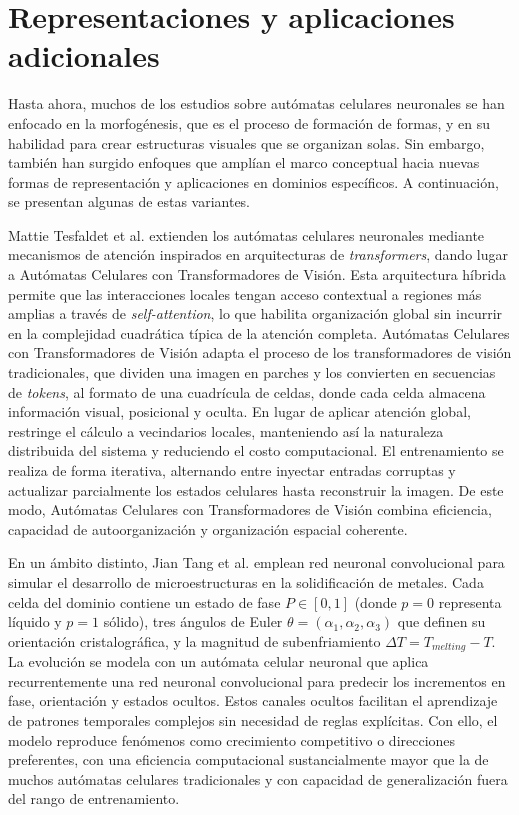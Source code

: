 \section{Representaciones y aplicaciones adicionales}

Hasta ahora, muchos de los estudios sobre autómatas celulares neuronales se han enfocado en la morfogénesis, que es el proceso de formación de formas, y en su habilidad para crear estructuras visuales que se organizan solas. Sin embargo, también han surgido enfoques que amplían el marco conceptual hacia nuevas formas de representación y aplicaciones en dominios específicos. A continuación, se presentan algunas de estas variantes.

Mattie Tesfaldet et al. \cite{ViTCA} extienden los autómatas celulares neuronales mediante mecanismos de atención inspirados en arquitecturas de \textit{transformers}, dando lugar a Autómatas Celulares con Transformadores de Visión. Esta arquitectura híbrida permite que las interacciones locales tengan acceso contextual a regiones más amplias a través de \textit{self-attention}, lo que habilita organización global sin incurrir en la complejidad cuadrática típica de la atención completa. Autómatas Celulares con Transformadores de Visión adapta el proceso de los transformadores de visión tradicionales, que dividen una imagen en parches y los convierten en secuencias de \textit{tokens}, al formato de una cuadrícula de celdas, donde cada celda almacena información visual, posicional y oculta. En lugar de aplicar atención global, restringe el cálculo a vecindarios locales, manteniendo así la naturaleza distribuida del sistema y reduciendo el costo computacional. El entrenamiento se realiza de forma iterativa, alternando entre inyectar entradas corruptas y actualizar parcialmente los estados celulares hasta reconstruir la imagen. De este modo, Autómatas Celulares con Transformadores de Visión combina eficiencia, capacidad de autoorganización y organización espacial coherente.

En un ámbito distinto, Jian Tang et al. \cite{JianNCA} emplean red neuronal convolucional para simular el desarrollo de microestructuras en la solidificación de metales. Cada celda del dominio contiene un estado de fase $P\in[0,1]$ (donde $p=0$ representa líquido y $p=1$ sólido), tres ángulos de Euler $\theta=(\alpha_1,\alpha_2,\alpha_3)$ que definen su orientación cristalográfica, y la magnitud de subenfriamiento $\Delta T=T_{melting}-T$. La evolución se modela con un autómata celular neuronal que aplica recurrentemente una red neuronal convolucional para predecir los incrementos en fase, orientación y estados ocultos. Estos canales ocultos facilitan el aprendizaje de patrones temporales complejos sin necesidad de reglas explícitas. Con ello, el modelo reproduce fenómenos como crecimiento competitivo o direcciones preferentes, con una eficiencia computacional sustancialmente mayor que la de muchos autómatas celulares tradicionales y con capacidad de generalización fuera del rango de entrenamiento.

